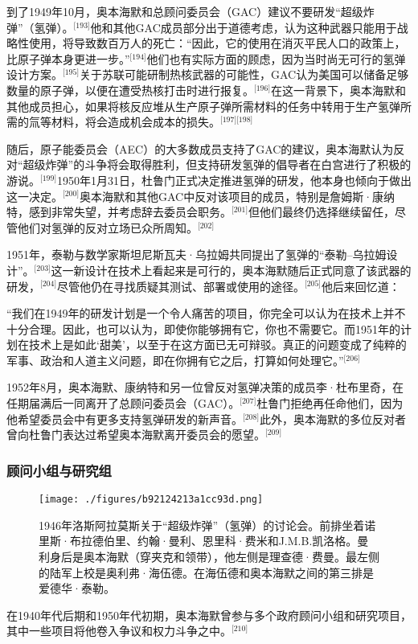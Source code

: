 到了1949年10月，奥本海默和总顾问委员会（GAC）建议不要研发“超级炸弹”（氢弹）。\(^\text{[193]}\)他和其他GAC成员部分出于道德考虑，认为这种武器只能用于战略性使用，将导致数百万人的死亡：“因此，它的使用在消灭平民人口的政策上，比原子弹本身更进一步。”\(^\text{[194]}\)他们也有实际方面的顾虑，因为当时尚无可行的氢弹设计方案。\(^\text{[195]}\)关于苏联可能研制热核武器的可能性，GAC认为美国可以储备足够数量的原子弹，以便在遭受热核打击时进行报复。\(^\text{[196]}\)在这一背景下，奥本海默和其他成员担心，如果将核反应堆从生产原子弹所需材料的任务中转用于生产氢弹所需的氚等材料，将会造成机会成本的损失。\(^\text{[197][198]}\)

随后，原子能委员会（AEC）的大多数成员支持了GAC的建议，奥本海默认为反对“超级炸弹”的斗争将会取得胜利，但支持研发氢弹的倡导者在白宫进行了积极的游说。\(^\text{[199]}\)1950年1月31日，杜鲁门正式决定推进氢弹的研发，他本身也倾向于做出这一决定。\(^\text{[200]}\)奥本海默和其他GAC中反对该项目的成员，特别是詹姆斯·康纳特，感到非常失望，并考虑辞去委员会职务。\(^\text{[201]}\)但他们最终仍选择继续留任，尽管他们对氢弹的反对立场已众所周知。\(^\text{[202]}\)

1951年，泰勒与数学家斯坦尼斯瓦夫·乌拉姆共同提出了氢弹的“泰勒–乌拉姆设计”。\(^\text{[203]}\)这一新设计在技术上看起来是可行的，奥本海默随后正式同意了该武器的研发，\(^\text{[204]}\)尽管他仍在寻找质疑其测试、部署或使用的途径。\(^\text{[205]}\)他后来回忆道：

“我们在1949年的研发计划是一个令人痛苦的项目，你完全可以认为在技术上并不十分合理。因此，也可以认为，即使你能够拥有它，你也不需要它。而1951年的计划在技术上是如此‘甜美’，以至于在这方面已无可辩驳。真正的问题变成了纯粹的军事、政治和人道主义问题，即在你拥有它之后，打算如何处理它。”\(^\text{[206]}\)

1952年8月，奥本海默、康纳特和另一位曾反对氢弹决策的成员李·杜布里奇，在任期届满后一同离开了总顾问委员会（GAC）。\(^\text{[207]}\)杜鲁门拒绝再任命他们，因为他希望委员会中有更多支持氢弹研发的新声音。\(^\text{[208]}\)此外，奥本海默的多位反对者曾向杜鲁门表达过希望奥本海默离开委员会的愿望。\(^\text{[209]}\)
\subsubsection{顾问小组与研究组}
\begin{figure}[ht]
\centering
\texttt{[image: ./figures/b92124213a1cc93d.png]}
\caption{1946年洛斯阿拉莫斯关于“超级炸弹”（氢弹）的讨论会。前排坐着诺里斯·布拉德伯里、约翰·曼利、恩里科·费米和J.M.B.凯洛格。曼利身后是奥本海默（穿夹克和领带），他左侧是理查德·费曼。最左侧的陆军上校是奥利弗·海伍德。在海伍德和奥本海默之间的第三排是爱德华·泰勒。} \label{fig_ABHM_11}
\end{figure}
在1940年代后期和1950年代初期，奥本海默曾参与多个政府顾问小组和研究项目，其中一些项目将他卷入争议和权力斗争之中。\(^\text{[210]}\)

